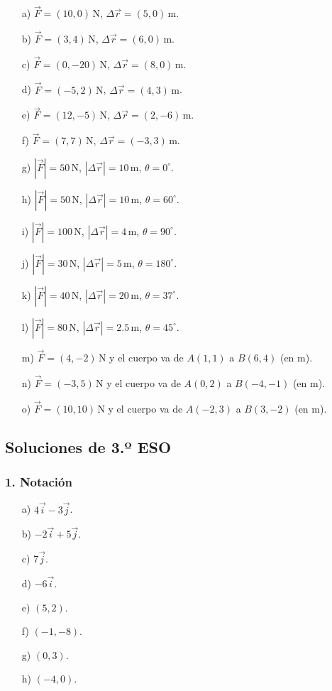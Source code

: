 \begin{enumerate}
    \item[a)] $\vec{F}=(10,0)\,\mathrm{N}$,
    $\Delta\vec{r}=(5,0)\,\mathrm{m}$.
    \item[b)] $\vec{F}=(3,4)\,\mathrm{N}$,
    $\Delta\vec{r}=(6,0)\,\mathrm{m}$.
    \item[c)] $\vec{F}=(0,-20)\,\mathrm{N}$,
    $\Delta\vec{r}=(8,0)\,\mathrm{m}$.
    \item[d)] $\vec{F}=(-5,2)\,\mathrm{N}$,
    $\Delta\vec{r}=(4,3)\,\mathrm{m}$.
    \item[e)] $\vec{F}=(12,-5)\,\mathrm{N}$,
    $\Delta\vec{r}=(2,-6)\,\mathrm{m}$.
    \item[f)] $\vec{F}=(7,7)\,\mathrm{N}$,
    $\Delta\vec{r}=(-3,3)\,\mathrm{m}$.
    \item[g)] $|\vec{F}|=50\,\mathrm{N}$,
    $|\Delta\vec{r}|=10\,\mathrm{m}$, $\theta=0^\circ$.
    \item[h)] $|\vec{F}|=50\,\mathrm{N}$,
    $|\Delta\vec{r}|=10\,\mathrm{m}$, $\theta=60^\circ$.
    \item[i)] $|\vec{F}|=100\,\mathrm{N}$,
    $|\Delta\vec{r}|=4\,\mathrm{m}$, $\theta=90^\circ$.
    \item[j)] $|\vec{F}|=30\,\mathrm{N}$,
    $|\Delta\vec{r}|=5\,\mathrm{m}$, $\theta=180^\circ$.
    \item[k)] $|\vec{F}|=40\,\mathrm{N}$,
    $|\Delta\vec{r}|=20\,\mathrm{m}$, $\theta=37^\circ$.
    \item[l)] $|\vec{F}|=80\,\mathrm{N}$,
    $|\Delta\vec{r}|=2.5\,\mathrm{m}$, $\theta=45^\circ$.
    \item[m)] $\vec{F}=(4,-2)\,\mathrm{N}$ y el cuerpo va de
    $A(1,1)$ a $B(6,4)$ (en $\mathrm{m}$).
    \item[n)] $\vec{F}=(-3,5)\,\mathrm{N}$ y el cuerpo va de
    $A(0,2)$ a $B(-4,-1)$ (en $\mathrm{m}$).
    \item[o)] $\vec{F}=(10,10)\,\mathrm{N}$ y el cuerpo va de
    $A(-2,3)$ a $B(3,-2)$ (en $\mathrm{m}$).
\end{enumerate}

\subsection{Soluciones de 3.º ESO}

\subsubsection*{1. Notación}
\begin{enumerate}
    \item[a)] $4\vec{i}-3\vec{j}$.
    \item[b)] $-2\vec{i}+5\vec{j}$.
    \item[c)] $7\vec{j}$.
    \item[d)] $-6\vec{i}$.
    \item[e)] $(5,2)$.
    \item[f)] $(-1,-8)$.
    \item[g)] $(0,3)$.
    \item[h)] $(-4,0)$.
\end{enumerate}

